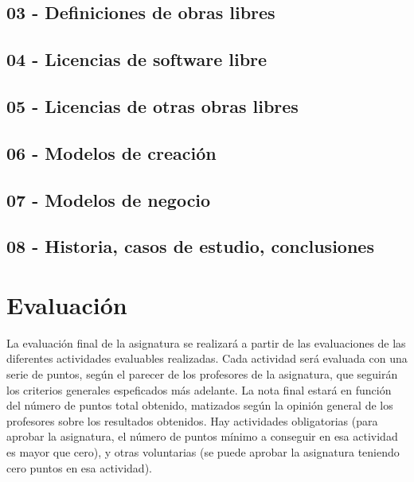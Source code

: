 \documentclass[a4paper,12pt]{article}
\begin{document}
\subsection{03 - Definiciones de obras libres}

\subsection{04 - Licencias de software libre}

\subsection{05 - Licencias de otras obras libres}

\subsection{06 - Modelos de creación}

\subsection{07 - Modelos de negocio}

\subsection{08 - Historia, casos de estudio, conclusiones}



\section{Evaluación}

La evaluación final de la asignatura se realizará a partir de las evaluaciones de las diferentes actividades evaluables realizadas. Cada actividad será evaluada con una serie de puntos, según el parecer de los profesores de la asignatura, que seguirán los criterios generales espeficados más adelante. La nota final estará en función del número de puntos total obtenido, matizados según la opinión general de los profesores sobre los resultados obtenidos. Hay actividades obligatorias (para aprobar la asignatura, el número de puntos mínimo a conseguir en esa actividad es mayor que cero), y otras voluntarias (se puede aprobar la asignatura teniendo cero puntos en esa actividad).
\end{document}
